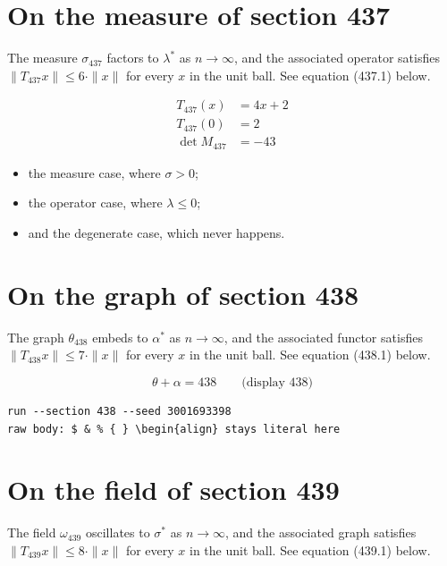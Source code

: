 \documentclass{article}
\begin{document}
\section{On the measure of section 437}
The measure $\sigma_{437}$ factors to $\lambda^{*}$ as $n \to \infty$,
and the associated operator satisfies $\|T_{437} x\| \leq 6 \cdot \|x\|$
for every $x$ in the unit ball. See equation (437.1) below.

\begin{align}
T_{437}(x) &= 4 x + 2 \\
T_{437}(0) &= 2 \\
\det M_{437} &= -43
\end{align}

\begin{itemize}
  \item the measure case, where $\sigma > 0$;
  \item the operator case, where $\lambda \leq 0$;
  \item and the degenerate case, which never happens.
\end{itemize}

\section{On the graph of section 438}
The graph $\theta_{438}$ embeds to $\alpha^{*}$ as $n \to \infty$,
and the associated functor satisfies $\|T_{438} x\| \leq 7 \cdot \|x\|$
for every $x$ in the unit ball. See equation (438.1) below.

$$
\theta + \alpha = 438 \qquad \text{(display 438)}
$$

\begin{verbatim}
run --section 438 --seed 3001693398
raw body: $ & % { } \begin{align} stays literal here
\end{verbatim}

\section{On the field of section 439}
The field $\omega_{439}$ oscillates to $\sigma^{*}$ as $n \to \infty$,
and the associated graph satisfies $\|T_{439} x\| \leq 8 \cdot \|x\|$
for every $x$ in the unit ball. See equation (439.1) below.
\end{document}
